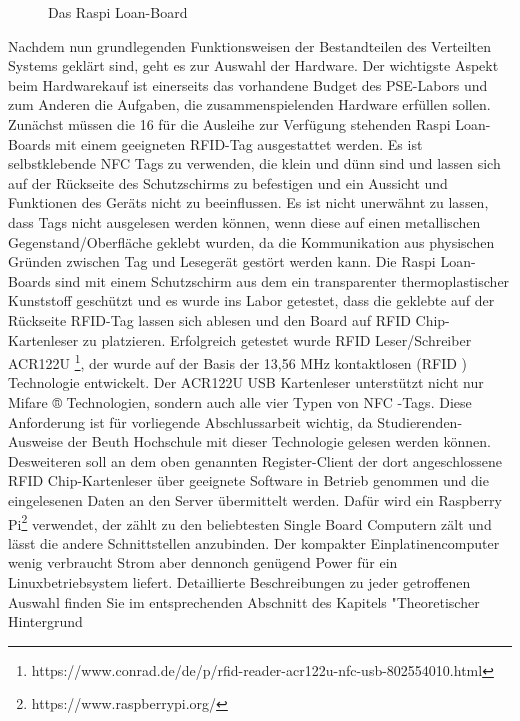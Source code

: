 \begin{figure}
	\caption{Das Raspi Loan-Board }
	\label{fig:click}
\end{figure}
Nachdem nun grundlegenden Funktionsweisen der Bestandteilen des Verteilten Systems geklärt sind, geht es zur Auswahl der Hardware. Der wichtigste Aspekt beim Hardwarekauf ist einerseits das vorhandene Budget des PSE-Labors und zum Anderen die Aufgaben, die zusammenspielenden Hardware erfüllen sollen. Zunächst müssen die 16 für die Ausleihe zur Verfügung stehenden Raspi Loan-Boards mit einem geeigneten RFID-Tag ausgestattet werden. Es ist selbstklebende NFC Tags zu verwenden, die klein und dünn sind und lassen sich auf der Rückseite des Schutzschirms zu befestigen und ein Aussicht und Funktionen des Geräts nicht zu beeinflussen. Es ist nicht unerwähnt zu lassen, dass Tags nicht ausgelesen werden können, wenn diese auf einen metallischen Gegenstand/Oberfläche geklebt wurden, da die Kommunikation aus physischen Gründen zwischen Tag und Lesegerät gestört werden kann. Die Raspi Loan-Boards sind mit einem Schutzschirm aus dem ein transparenter thermoplastischer Kunststoff geschützt und es wurde ins Labor getestet, dass die geklebte auf der Rückseite RFID-Tag lassen sich ablesen und den Board auf RFID Chip-Kartenleser zu platzieren. Erfolgreich getestet wurde RFID Leser/Schreiber ACR122U \footnote{https://www.conrad.de/de/p/rfid-reader-acr122u-nfc-usb-802554010.html}, der wurde auf der Basis der 13,56 MHz kontaktlosen (RFID ) Technologie entwickelt. Der ACR122U USB Kartenleser unterstützt nicht nur Mifare ® Technologien, sondern auch alle vier Typen von NFC -Tags. Diese Anforderung ist für vorliegende Abschlussarbeit wichtig, da Studierenden-Ausweise der Beuth Hochschule mit dieser Technologie gelesen werden können. Desweiteren soll an dem oben genannten Register-Client der dort angeschlossene RFID Chip-Kartenleser über geeignete Software in Betrieb genommen und die eingelesenen Daten an den Server übermittelt werden. Dafür wird ein Raspberry Pi\footnote{https://www.raspberrypi.org/} verwendet, der zählt zu den beliebtesten Single Board Computern zält und lässt die andere Schnittstellen anzubinden. Der kompakter Einplatinencomputer wenig verbraucht Strom aber dennonch genügend Power für ein Linuxbetriebsystem liefert. Detaillierte Beschreibungen zu jeder getroffenen Auswahl finden Sie im entsprechenden Abschnitt des Kapitels "Theoretischer Hintergrund



 
 